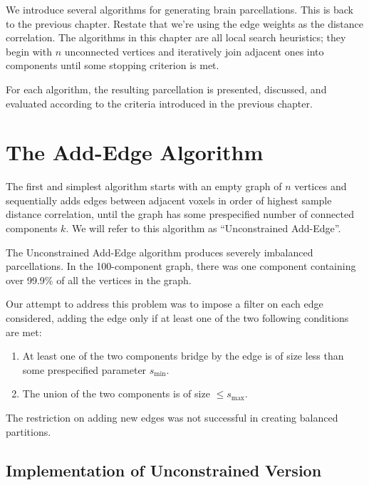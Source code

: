
We introduce several algorithms for generating brain parcellations. {\color{red}
This is back to the previous chapter. Restate that we're using the edge weights
as the distance correlation.} The
algorithms in this chapter are all local search heuristics; they begin
with $n$ unconnected vertices and iteratively join adjacent ones into
components until some stopping criterion is met.

For each algorithm, the resulting parcellation is presented, discussed,
and evaluated according to the criteria introduced in the previous
chapter.

\section{The Add-Edge Algorithm}

The first and simplest algorithm starts with an empty graph of $n$
vertices and sequentially adds edges between adjacent voxels in order of
highest sample distance correlation, until the graph has some
prespecified number of connected components $k$. We will refer to this
algorithm as ``Unconstrained Add-Edge''.

The Unconstrained Add-Edge algorithm produces severely imbalanced
parcellations. In the 100-component graph, there was one component
containing over 99.9\% of all the vertices in the graph.

Our attempt to address this problem was to impose a filter on each edge
considered, adding the edge only if at least one of the two following
conditions are met:

\begin{enumerate}[1.]
\item
At least one of the two components bridge by the edge is of size less
than some prespecified parameter $s_{\min}$.

\item
The union of the two components is of size $\leq s_{\max}$.
\end{enumerate}

The restriction on adding new edges was not successful in creating
balanced partitions.

\subsection{Implementation of Unconstrained Version}


